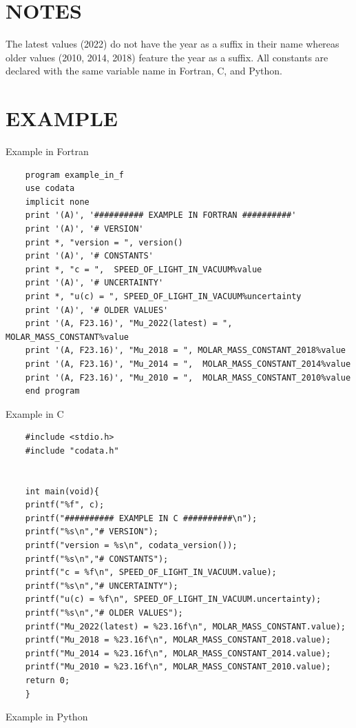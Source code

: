\section*{NOTES}
The latest values (2022) do not have the year as a suffix in their name
whereas older values (2010, 2014, 2018) feature the year as a suffix.
All constants are declared with the same variable name in Fortran, C,
and Python.

\section*{EXAMPLE}

Example in Fortran

\begin{verbatim}
    program example_in_f
    use codata
    implicit none
    print '(A)', '########## EXAMPLE IN FORTRAN ##########'
    print '(A)', '# VERSION'
    print *, "version = ", version()
    print '(A)', '# CONSTANTS'
    print *, "c = ",  SPEED_OF_LIGHT_IN_VACUUM%value
    print '(A)', '# UNCERTAINTY'
    print *, "u(c) = ", SPEED_OF_LIGHT_IN_VACUUM%uncertainty
    print '(A)', '# OLDER VALUES'
    print '(A, F23.16)', "Mu_2022(latest) = ", MOLAR_MASS_CONSTANT%value
    print '(A, F23.16)', "Mu_2018 = ", MOLAR_MASS_CONSTANT_2018%value
    print '(A, F23.16)', "Mu_2014 = ",  MOLAR_MASS_CONSTANT_2014%value
    print '(A, F23.16)', "Mu_2010 = ",  MOLAR_MASS_CONSTANT_2010%value
    end program

\end{verbatim}
Example in C

\begin{verbatim}
    #include <stdio.h>
    #include "codata.h"


    int main(void){
    printf("%f", c);
    printf("########## EXAMPLE IN C ##########\n");
    printf("%s\n","# VERSION");
    printf("version = %s\n", codata_version());
    printf("%s\n","# CONSTANTS");
    printf("c = %f\n", SPEED_OF_LIGHT_IN_VACUUM.value);
    printf("%s\n","# UNCERTAINTY");
    printf("u(c) = %f\n", SPEED_OF_LIGHT_IN_VACUUM.uncertainty);
    printf("%s\n","# OLDER VALUES");
    printf("Mu_2022(latest) = %23.16f\n", MOLAR_MASS_CONSTANT.value);
    printf("Mu_2018 = %23.16f\n", MOLAR_MASS_CONSTANT_2018.value);
    printf("Mu_2014 = %23.16f\n", MOLAR_MASS_CONSTANT_2014.value);
    printf("Mu_2010 = %23.16f\n", MOLAR_MASS_CONSTANT_2010.value);
    return 0;
    }

\end{verbatim}
Example in Python

